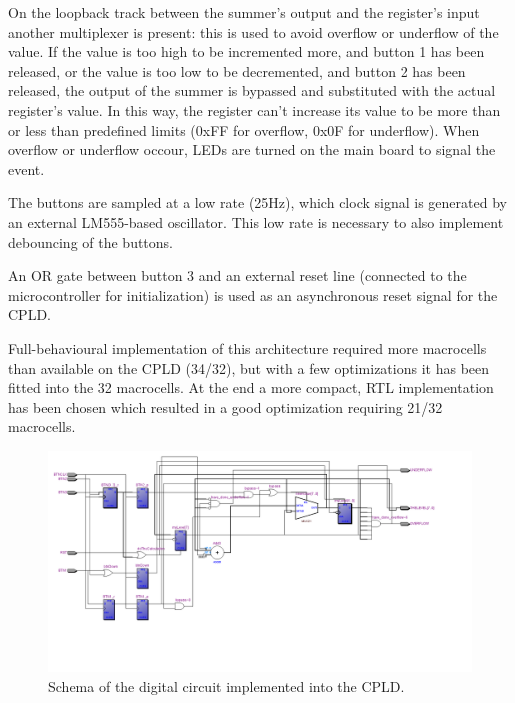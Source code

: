 On the loopback track between the summer's output and the register's input another multiplexer is present: this is used to avoid overflow or underflow of the value. If the value is too high to be incremented more, and button 1 has been released, or the value is too low to be decremented, and button 2 has been released, the output of the summer is bypassed and substituted with the actual register's value. In this way, the register can't increase its value to be more than or less than predefined limits (0xFF for overflow, 0x0F for underflow). When overflow or underflow occour, LEDs are turned on the main board to signal the event.

The buttons are sampled at a low rate (25Hz), which clock signal is generated by an external LM555-based oscillator. This low rate is necessary to also implement debouncing of the buttons.

An OR gate between button 3 and an external reset line (connected to the microcontroller for initialization) is used as an asynchronous reset signal for the CPLD.

Full-behavioural implementation of this architecture required more macrocells than available on the CPLD (34/32), but with a few optimizations it has been fitted into the 32 macrocells. At the end a more compact, RTL implementation has been chosen which resulted in a good optimization requiring 21/32 macrocells.

\begin{figure}[htbp]
\centering
\includegraphics[width=6in]{Graphics/mouseSchema}
\caption{Schema of the digital circuit implemented into the CPLD.}
\end{figure}

